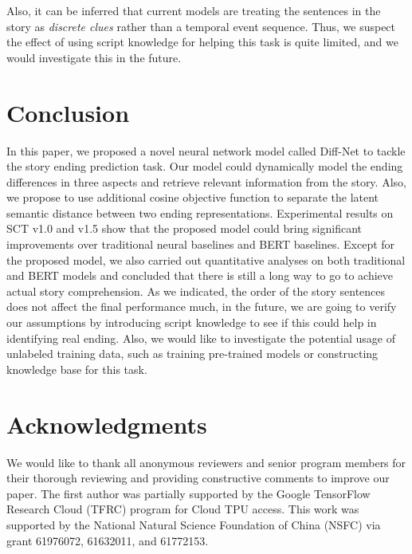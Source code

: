 \documentclass[letterpaper]{article} %
\begin{document}
Also, it can be inferred that current models are treating the sentences in the story as {\em discrete clues} rather than a temporal event sequence. Thus, we suspect the effect of using script knowledge for helping this task is quite limited, and we would investigate this in the future.



\vspace{-3.54mm}
\section{Conclusion}\label{conclusion}
In this paper, we proposed a novel neural network model called Diff-Net to tackle the story ending prediction task.
Our model could dynamically model the ending differences in three aspects and retrieve relevant information from the story.
Also, we propose to use additional cosine objective function to separate the latent semantic distance between two ending representations.
Experimental results on SCT v1.0 and v1.5 show that the proposed model could bring significant improvements over traditional neural baselines and BERT baselines.
Except for the proposed model, we also carried out quantitative analyses on both traditional and BERT models and concluded that there is still a long way to go to achieve actual story comprehension.  As we indicated, the order of the story sentences does not affect the final performance much, in the future, we are going to verify our assumptions by introducing script knowledge to see if this could help in identifying real ending.
Also, we would like to investigate the potential usage of unlabeled training data, such as training pre-trained models or constructing knowledge base for this task.


\vspace{-3.52mm}
\section{Acknowledgments}\label{ack}
We would like to thank all anonymous reviewers and senior program members for their thorough reviewing and providing constructive comments to improve our paper.
The first author was partially supported by the Google TensorFlow Research Cloud (TFRC) program for Cloud TPU access.
This work was supported by the National Natural Science Foundation of China (NSFC) via grant 61976072, 61632011, and 61772153.
\end{document}
